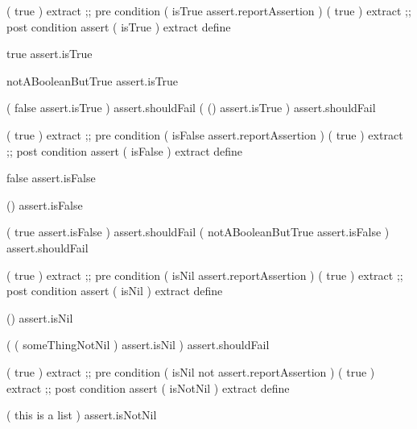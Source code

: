 
\startJoylolCode
( { true } ) extract ;; pre condition
(
  isTrue
  assert.reportAssertion
)
( { true } ) extract ;; post condition
assert
( isTrue ) extract
define
\stopJoylolCode

\startJoylolTest
true
assert.isTrue

notABooleanButTrue
assert.isTrue
\stopJoylolTest
\stopTestCase

\startJoylolTest
(
  false
  assert.isTrue 
) assert.shouldFail
(
  ()
  assert.isTrue
) assert.shouldFail
\stopJoylolTest
\stopTestCase
\stopTestSuite


\startJoylolCode
( { true } ) extract ;; pre condition
(
  isFalse
  assert.reportAssertion
)
( { true } ) extract ;; post condition
assert
( isFalse ) extract
define
\stopJoylolCode

\startJoylolTest
false
assert.isFalse

()
assert.isFalse
\stopJoylolTest
\stopTestCase

\startJoylolTest
(
  true
  assert.isFalse
) assert.shouldFail
(
  notABooleanButTrue
  assert.isFalse
) assert.shouldFail
\stopJoylolTest
\stopTestCase
\stopTestSuite


\startJoylolCode
( { true } ) extract ;; pre condition
(
  isNil
  assert.reportAssertion
)
( { true } ) extract ;; post condition
assert
( isNil ) extract
define
\stopJoylolCode

\startJoylolTest
()
assert.isNil
\stopJoylolTest
\stopTestCase

\startJoylolTest
(
  ( someThingNotNil )
  assert.isNil
) assert.shouldFail
\stopJoylolTest
\stopTestCase

\stopTestSuite


\startJoylolCode
( { true } ) extract ;; pre condition
(
  isNil
  not
  assert.reportAssertion
)
( { true } ) extract ;; post condition
assert
( isNotNil ) extract
define
\stopJoylolCode

\startJoylolTest
( this is a list )
assert.isNotNil
\stopJoylolTest
\stopTestCase

